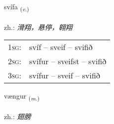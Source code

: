 \documentclass[frontgrid, backgrid]{flacards}\usepackage[]{graphicx}\usepackage[]{xcolor}
\begin{document}
\renewcommand{\flhead}{\vskip5pt \fboxsep=0pt {\small\bfseries\footnotesize Sagnorð | 动词}}
\renewcommand{\fcfoot}{\vskip5pt \fboxsep=0pt \hspace{2pt}{\small\bfseries\footnotesize 3K}}

\renewcommand{\blhead}{\vskip5pt {\small\bfseries\footnotesize Sagnorð | 动词 }}
\renewcommand{\bcfoot}{\vskip5pt \hspace{2pt}{\small\bfseries\footnotesize 3K}}


{svífa \small{\textsubscript{(\textit{v.})}} \\[1ex] %
\textphonetic{[sviːva]} \\
zh.: \emph{滑翔，悬停，翱翔} \\  [2ex]
\renewcommand*{\arraystretch}{0.8}
\begin{tabular}{p{1cm}l}
\textsc{1sg}: & svíf -- sveif -- svifið \\ 
\textsc{2sg}: & svífur -- sveifst -- svifið \\ 
\textsc{3sg}: & svífur -- sveif -- svifið \\ 
\end{tabular}
}

\renewcommand{\flhead}{\vskip5pt \fboxsep=0pt {\small\bfseries\footnotesize Nafnorð | 名词}}
\renewcommand{\fcfoot}{\vskip5pt \fboxsep=0pt \hspace{2pt}{\small\bfseries\footnotesize 3K}}

\renewcommand{\blhead}{\vskip5pt {\small\bfseries\footnotesize Nafnorð | 名词 }}
\renewcommand{\bcfoot}{\vskip5pt \hspace{2pt}{\small\bfseries\footnotesize 3K}}


{vængur \small{\textsubscript{(\textit{m.})}} \\[1ex] %
\textphonetic{[vaiŋkʏr]} \\
zh.: \emph{翅膀} \\  [2ex]
\renewcommand*{\arraystretch}{0.8}
}
\end{document}

